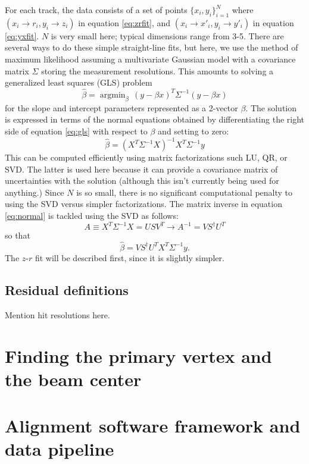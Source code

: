 \documentclass[12pt]{article}
\DeclareMathOperator*{\argmin}{argmin}
\begin{document}
 For each track, the data consists of a set of points $\{x_i,y_i\}_{i=1}^N$ where $(x_i \to r_i, y_i \to z_i)$ in equation \ref{eq:zrfit}, and $(x_i \to x'_i, y_i \to y'_i)$ in equation \ref{eq:yxfit}. $N$ is very small here; typical dimensions range from 3-5. There are several ways to do these simple straight-line fits, but here, we use the method of maximum likelihood assuming a multivariate Gaussian model with a covariance matrix $\Sigma$ storing the measurement resolutions. This amounts to solving a generalized least squares (GLS) problem
 \begin{equation}\label{eq:gls}
 \hat\beta = \argmin_{\beta} \, (y - \beta x)^T \Sigma^{-1} (y - \beta x)
 \end{equation}
 for the slope and intercept parameters represented as a 2-vector $\beta$. The solution is expressed in terms of the normal equations obtained by differentiating the right side of equation \ref{eq:gls} with respect to $\beta$ and setting to zero:
 \begin{equation}\label{eq:normal}
 \hat\beta = (X^T \Sigma^{-1} X)^{-1} X^T \Sigma^{-1} y
 \end{equation}
This can be computed efficiently using matrix factorizations such LU, QR, or SVD. The latter is used here because it can provide a covariance matrix of uncertainties with the solution (although this isn't currently being used for anything.) Since $N$ is so small, there is no significant computational penalty to using the SVD versus simpler factorizations. The matrix inverse in equation \ref{eq:normal} is tackled using the SVD as follows:
\begin{equation}\label{eq:svd}
A \equiv X^T \Sigma^{-1} X = U S V^T \to A^{-1} = V S^{\dagger} U^{T}
\end{equation}
so that 
\begin{equation}\label{eq:betahat}
\hat\beta = V S^{\dagger} U^{T} X^T \Sigma^{-1} y.
\end{equation}
The $z$-$r$ fit will be described first, since it is slightly simpler.
\subsection{Residual definitions}
Mention hit resolutions here.
\section{Finding the primary vertex and the beam center}

\section{Alignment software framework and data pipeline}
\end{document}
